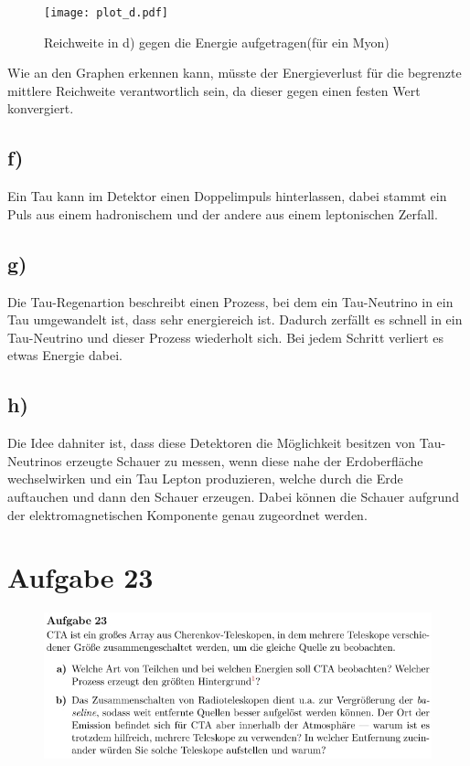 \begin{figure}[H]
    \centering
    \texttt{[image: plot\_d.pdf]}
    \caption{Reichweite in d) gegen die Energie aufgetragen(für ein Myon)}
\end{figure}

Wie an den Graphen erkennen kann, müsste der Energieverlust für die begrenzte 
mittlere Reichweite verantwortlich sein, da dieser gegen einen festen Wert konvergiert.


\subsection{f)} \justifying
Ein Tau kann im Detektor einen Doppelimpuls hinterlassen, dabei stammt ein Puls
aus einem hadronischem und der andere aus einem leptonischen Zerfall.

\subsection{g)}
Die Tau-Regenartion beschreibt einen Prozess, bei dem ein Tau-Neutrino in ein
Tau umgewandelt ist, dass sehr energiereich ist. Dadurch zerfällt es schnell
in ein Tau-Neutrino und dieser Prozess wiederholt sich. Bei jedem Schritt 
verliert es etwas Energie dabei.

\subsection{h)}
Die Idee dahniter ist, dass diese Detektoren die Möglichkeit besitzen von 
Tau-Neutrinos erzeugte Schauer zu messen, wenn diese nahe der Erdoberfläche wechselwirken
und ein Tau Lepton produzieren, welche durch die Erde auftauchen und dann den Schauer
erzeugen. Dabei können die Schauer aufgrund der elektromagnetischen Komponente genau zugeordnet 
werden.


\section{Aufgabe 23}

    \begin{figure}[H]
        \centering
        \includegraphics[width=\textwidth]{images/Aufgabe23a.jpg}
        \label{fig:3}
    \end{figure}

